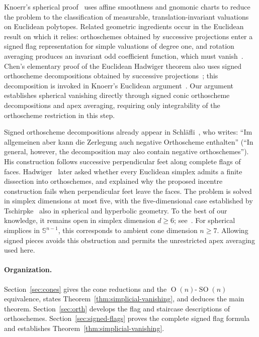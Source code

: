 \documentclass[11pt]{article}
\newcommand{\SOn}[1]{\operatorname{SO}(#1)}
\newcommand{\On}[1]{\operatorname{O}(#1)}
\newcommand{\sphere}[1]{\mathbb{S}^{#1}}
\begin{document}
Knoerr's spherical proof~\cite{Knoerr:Spherical-Hadwiger} uses affine
smoothness and gnomonic charts to reduce the problem to the classification
of measurable, translation-invariant valuations on Euclidean polytopes.
Related geometric ingredients occur in the Euclidean result on which it
relies: orthoschemes obtained by successive projections enter a signed
flag representation for simple valuations of degree one, and rotation
averaging produces an invariant odd coefficient function, which must
vanish~\cite[\S4 and Proposition~5.1]{Knoerr:Polytopal-Hadwiger}.
Chen's elementary proof of the Euclidean Hadwiger theorem also uses signed
orthoscheme decompositions obtained by successive
projections~\cite[Lemma~3.3]{Chen:Elementary-Hadwiger}; this decomposition
is invoked in Knoerr's Euclidean
argument~\cite[Lemma~5.2]{Knoerr:Polytopal-Hadwiger}.
Our argument establishes spherical vanishing directly through signed
conic orthoscheme decompositions and apex averaging, requiring only
integrability of the orthoscheme restriction in this step.

Signed orthoscheme decompositions already appear in
Schl\"afli~\cite[\S25, pp.~76--78]{schlaefli:1901}, who writes:
``Im allgemeinen aber kann die Zerlegung auch negative Orthoscheme
enthalten'' (``In general, however, the decomposition may also contain
negative orthoschemes''). His construction follows successive perpendicular
feet along complete flags of faces. Hadwiger~\cite{hadwiger-dissect:1956}
later asked whether every Euclidean simplex admits a finite dissection
into orthoschemes, and explained why the proposed incentre construction
fails when perpendicular feet leave the faces. The problem is solved in
simplex dimensions at most five, with the five-dimensional case established
by Tschirpke~\cite{tschirpke:1994} also in spherical and hyperbolic geometry.
To the best of our knowledge, it remains open in simplex dimension $d\ge6$;
see~\cite[Conjecture~23 and the ensuing discussion, pp.~327--328]{BKKS:2009}.
For spherical simplices in $\sphere{n-1}$, this corresponds to ambient cone
dimension $n\ge7$. Allowing signed pieces
avoids this obstruction and permits the unrestricted apex averaging used
here.

\paragraph{Organization.}
Section~\ref{sec:cones} gives the cone reductions and the $\On n$-$\SOn n$ equivalence,
states Theorem~\ref{thm:simplicial-vanishing}, and deduces the main theorem.
Section~\ref{sec:orth} develops the flag and staircase descriptions of
orthoschemes. Section~\ref{sec:signed-flags} proves the complete signed
flag formula and establishes Theorem~\ref{thm:simplicial-vanishing}.
\end{document}
